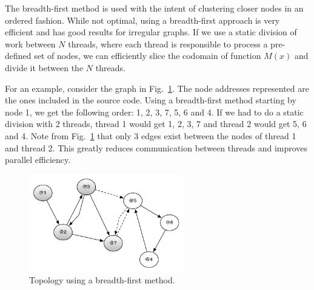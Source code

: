 The breadth-first method is used with the intent of clustering closer nodes in
an ordered fashion.  While not optimal, using a breadth-first approach is very
efficient and has good results for irregular graphs. If we use a static division
of work between $N$ threads, where each thread is responsible to process a
pre-defined set of nodes, we can efficiently slice the codomain of function
$M(x)$ and divide it between the $N$ threads.

For an example, consider the graph in Fig.~\ref{fig:compiler:topology1}. The
node addresses represented are the ones included in the source code. Using a
breadth-first method starting by node 1, we get the following order: 1, 2, 3, 7,
5, 6 and 4. If we had to do a static division with 2 threads, thread 1 would get
1, 2, 3, 7 and thread 2 would get 5, 6 and 4. Note from
Fig.~\ref{fig:compiler:topology1} that only 3 edges exist between the nodes of
thread 1 and thread 2. This greatly reduces communication between threads and
improves parallel efficiency.

\begin{figure}[ht]
  \centering
  \includegraphics[width=0.6\textwidth]{figures/compiler/topology1.pdf}
  \caption{Topology using a breadth-first method.}
  \label{fig:compiler:topology1}
\end{figure}
\fi
